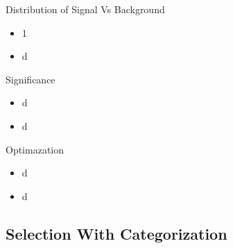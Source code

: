 \documentclass{beamer}
\begin{document}
\begin{frame}{Distribution of Signal Vs Background}
    \begin{itemize}
    \item
      1 
    \item
       d 
    \end{itemize}
\end{frame}



\begin{frame}{Significance}
    \begin{itemize}
    \item
       d
    \item
        d
    \end{itemize}
    \begin{table}[htbp] %
    \centering
    \footnotesize%
    \setlength\tabcolsep{2pt}%
    \resizebox{\textwidth}{!}{%
        \begin{tabular}{|c | c |c|} 
         \hline
         process & preselection &  step1 \\%
         \hline
         \hline
         2Tau 3L & 3 tight lepton & 2 medium tau\\
         \hline
        \end{tabular}
    }
    \caption{Subchannel}
    \label{table:4}
    \end{table}   
\end{frame}



\begin{frame}{Optimazation}
    \begin{itemize}
    \item
       d
    \item
        d
    \end{itemize}
\end{frame}


\subsection{Selection With Categorization}
\end{document}
